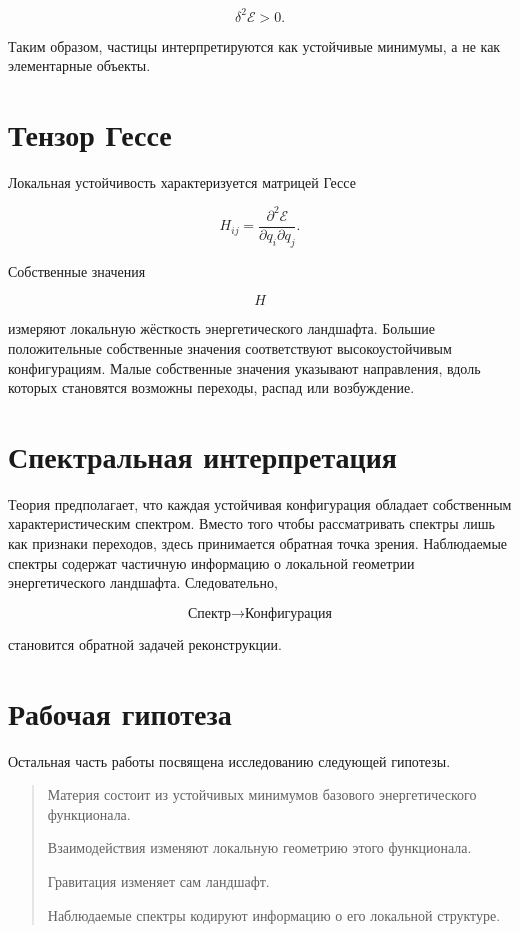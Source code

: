 \[ \delta^2\mathcal E>0. \]

Таким образом, частицы интерпретируются как устойчивые минимумы, а не как элементарные объекты.

\section{Тензор Гессе}

Локальная устойчивость характеризуется матрицей Гессе

\[ H_{ij} = \frac{\partial^2\mathcal E} {\partial q_i\partial q_j}. \]

Собственные значения

\[ H \]

измеряют локальную жёсткость энергетического ландшафта. Большие положительные собственные значения соответствуют высокоустойчивым конфигурациям. Малые собственные значения указывают направления, вдоль которых становятся возможны переходы, распад или возбуждение.

\section{Спектральная интерпретация}

Теория предполагает, что каждая устойчивая конфигурация обладает собственным характеристическим спектром. Вместо того чтобы рассматривать спектры лишь как признаки переходов, здесь принимается обратная точка зрения. Наблюдаемые спектры содержат частичную информацию о локальной геометрии энергетического ландшафта. Следовательно,

\[ \text{Спектр} \longrightarrow \text{Конфигурация} \]

становится обратной задачей реконструкции.

\section{Рабочая гипотеза}

Остальная часть работы посвящена исследованию следующей гипотезы.

\begin{quote}
Материя состоит из устойчивых минимумов базового энергетического функционала.

Взаимодействия изменяют локальную геометрию этого функционала.

Гравитация изменяет сам ландшафт.

Наблюдаемые спектры кодируют информацию о его локальной структуре.
\end{quote}

